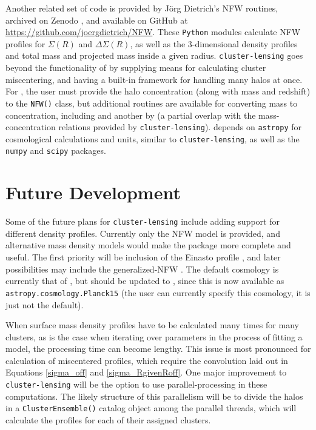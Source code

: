 \documentclass[twocolumn]{aastex6}
\newcommand{\code}{\lstinline[style=codeintext]}
\begin{document}
Another related set of code is provided by J\"{o}rg Dietrich's NFW routines, archived on Zenodo \citep{DietrichNFW}, and available on GitHub at \url{https://github.com/joergdietrich/NFW}. These \code{Python} modules calculate NFW profiles for $\Sigma(R)$ and $\Delta\Sigma(R)$, as well as the 3-dimensional density profiles and total mass and projected mass inside a given radius. \code{cluster-lensing} goes beyond the functionality of \citet{DietrichNFW} by supplying means for calculating cluster miscentering, and having a built-in framework for handling many halos at once. For \citet{DietrichNFW}, the user must provide the halo concentration (along with mass and redshift) to the \code{NFW()} class, but additional routines are available for converting mass to concentration, including \citet{Duffy08} and another by \citet{Dolag04} (a partial overlap with the mass-concentration relations provided by \code{cluster-lensing}). \citet{DietrichNFW} depends on \code{astropy} for cosmological calculations and units, similar to \code{cluster-lensing}, as well as the \code{numpy} and \code{scipy} packages. 


\section{Future Development}
\label{future}

Some of the future plans for \code{cluster-lensing} include adding support for different density profiles. Currently only the NFW model is provided, and alternative mass density models would make the package more complete and useful. The first priority will be inclusion of the Einasto profile \citep{Einasto65}, and later possibilities may include the generalized-NFW \citep{Zhao96}. The default cosmology is currently that of \citet{PlanckXVI}, but should be updated to \citet{PlanckXIII_15}, since this is now available as \code{astropy.cosmology.Planck15} (the user can currently specify this cosmology, it is just not the default). 

When surface mass density profiles have to be calculated many times for many clusters, as is the case when iterating over parameters in the process of fitting a model, the processing time can become lengthy. This issue is most pronounced for calculation of miscentered profiles, which require the convolution laid out in Equations \ref{sigma_off} and \ref{sigma_RgivenRoff}. One major improvement to \code{cluster-lensing} will be the option to use parallel-processing in these computations. The likely structure of this parallelism will be to divide the halos in a \code{ClusterEnsemble()} catalog object among the parallel threads, which will calculate the profiles for each of their assigned clusters.
\end{document}
